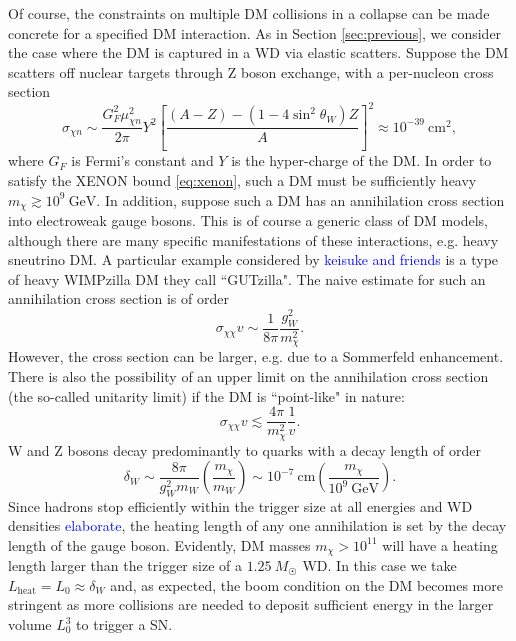 \documentclass[preprintnumbers,amsmath,amssymb,prd,superscriptaddress]{revtex4}
\newcommand{\GeV}{\text{GeV}}
\newcommand{\cm}{\text{cm}}
\def\r{\right)}
\def\l{\left(}
\begin{document}
Of course, the constraints on multiple DM collisions in a collapse can be made concrete for a specified DM interaction. 
As in Section \ref{sec:previous}, we consider the case where the DM is captured in a WD via elastic scatters. 
Suppose the DM scatters off nuclear targets through Z boson exchange, with a per-nucleon cross section
\begin{equation}
\label{eq:Zscattering}
\sigma_{\chi n} \sim \frac{G_F^2 \mu_{\chi n}^2}{2\pi} Y^2 \left [\frac{(A-Z) - (1-4 \sin^2{\theta_W})Z}{A} \right ]^2 \approx 10^{-39} ~\cm^2,
\end{equation}
where $G_F$ is Fermi's constant and $Y$ is the hyper-charge of the DM. 
In order to satisfy the XENON bound \eqref{eq:xenon}, such a DM must be sufficiently heavy $m_\chi \gtrsim 10^9 ~\GeV$. 
In addition, suppose such a DM has an annihilation cross section into electroweak gauge bosons.
This is of course a generic class of DM models, although there are many specific manifestations of these interactions, e.g. heavy sneutrino DM. 
A particular example considered by \textcolor{blue}{keisuke and friends} is a type of heavy WIMPzilla DM they call ``GUTzilla".
The naive estimate for such an annihilation cross section is of order
\begin{equation}
\sigma_{\chi \chi} v \sim \frac{1}{8\pi} \frac{g_W^2}{m_\chi^2}.
\end{equation}
However, the cross section can be larger, e.g. due to a Sommerfeld enhancement. 
There is also the possibility of an upper limit on the annihilation cross section (the so-called unitarity limit) if the DM is ``point-like" in nature:
\begin{equation}
\sigma_{\chi \chi} v \lesssim \frac{4 \pi}{m_\chi^2} \frac{1}{v}.
\end{equation}
W and Z bosons decay predominantly to quarks with a decay length of order
\begin{equation}
\delta_W \sim \frac{8\pi}{g_W^2 m_W} \l \frac{m_\chi}{m_W} \r \sim 10^{-7} ~\cm \l \frac{m_\chi}{10^{9} ~\GeV} \r. 
\end{equation}
Since hadrons stop efficiently within the trigger size at all energies and WD densities \textcolor{blue}{elaborate}, the heating length of any one annihilation is set by the decay length of the gauge boson. 
Evidently, DM masses $m_\chi > 10^{11}$ will have a heating length larger than the trigger size of a $1.25~M_{\astrosun}$ WD.
In this case we take $L_\text{heat} = L_0 \approx \delta_W$ and, as expected, the boom condition on the DM becomes more stringent as more collisions are needed to deposit sufficient energy in the larger volume $L_0^3$ to trigger a SN. 
\end{document}
